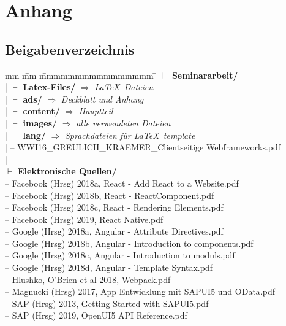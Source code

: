 
\chapter{Anhang}
\section{Beigabenverzeichnis }
\begin{tabbing}
	mm \= mm \= mmmmmmmmmmmmmmmm \= \kill
	$\vdash$ \textbf{Seminararbeit/} \\ 
	| \>  $\vdash$ \textbf{Latex-Files/}   $\Rightarrow$ \textit{ \LaTeX~Dateien}\\ 
	|\> \>  $\vdash$  \textbf{ads/}   	\> $\Rightarrow$ \textit{Deckblatt und Anhang}\\
	| \> \>  $\vdash$  \textbf{content/}  \> $\Rightarrow$ \textit{Hauptteil}\\
	| \> \>  $\vdash$  \textbf{images/}   \> $\Rightarrow$ \textit{alle verwendeten Dateien}\\
	| \> \>  $\vdash$  \textbf{lang/}    \> $\Rightarrow$ \textit{Sprachdateien für \LaTeX~template}\\
	|\> -- WWI16\_GREULICH\_KRAEMER\_Clientseitige Webframeworks.pdf\\
	|\\
	$\vdash$ \textbf{Elektronische Quellen/} \\ %
	\>  -- Facebook (Hrsg) 2018a, React - Add React to a Website.pdf\\
	\>  -- Facebook (Hrsg) 2018b, React - ReactComponent.pdf\\
	\>  -- Facebook (Hrsg) 2018c, React - Rendering Elements.pdf\\
	\>  -- Facebook (Hrsg) 2019, React Native.pdf\\
	\>  -- Google (Hrsg) 2018a, Angular - Attribute Directives.pdf\\
	\>  -- Google (Hrsg) 2018b, Angular - Introduction to components.pdf\\
	\>  -- Google (Hrsg) 2018c, Angular - Introduction to moduls.pdf\\
	\>  -- Google (Hrsg) 2018d, Angular - Template Syntax.pdf\\
	\>  -- Hlushko, O'Brien et al 2018, Webpack.pdf\\
	\>  -- Magnucki (Hrsg) 2017, App Entwicklung mit SAPUI5 und OData.pdf\\
	\>  -- SAP (Hrsg) 2013,  Getting Started with SAPUI5.pdf\\
	\>  -- SAP (Hrsg) 2019, OpenUI5 API Reference.pdf\\
\end{tabbing}